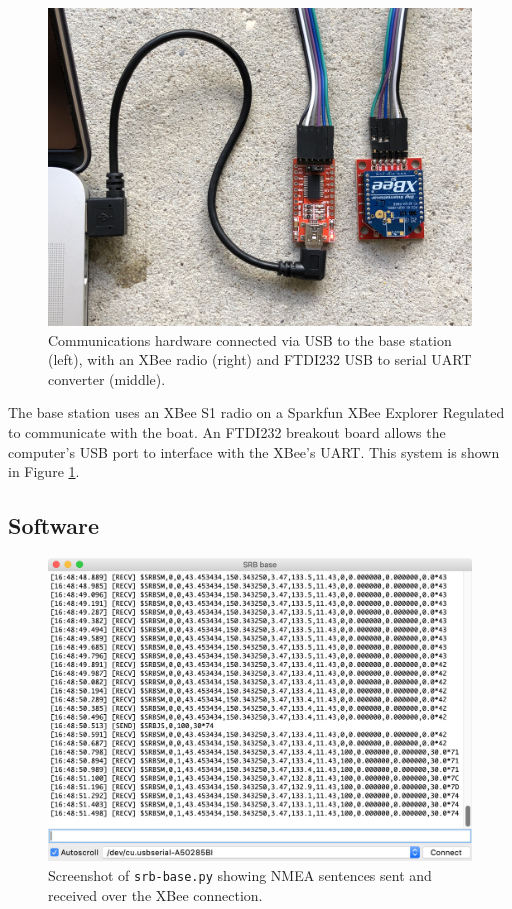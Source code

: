 \documentclass[a4paper]{IEEEtran}
\begin{document}
\begin{figure}[h!]
\includegraphics[width=\columnwidth]{comms-hardware.jpg}
\caption{Communications hardware connected via USB to the base station (left), with an XBee radio (right) and FTDI232 USB to serial UART converter (middle).}
\label{commshardware}
\end{figure}

The base station uses an XBee S1 radio on a Sparkfun XBee Explorer Regulated to communicate with the boat. An FTDI232 breakout board allows the computer's USB port to interface with the XBee's UART. This system is shown in Figure \ref{commshardware}.

\subsection{Software}

\begin{figure}[h!]
\includegraphics[width=\columnwidth]{srb-base-screenshot.png}
\caption{Screenshot of \texttt{srb-base.py} showing NMEA sentences sent and received over the XBee connection.}
\label{srbbase}
\end{figure}
\end{document}
